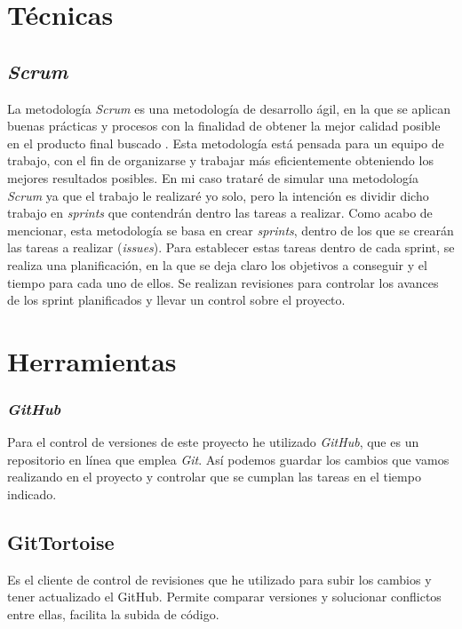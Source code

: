 
\section{Técnicas}

\subsection{\textit{Scrum}}
La metodología \textit{Scrum} es una metodología de desarrollo ágil, en la que se aplican buenas prácticas y procesos con la finalidad de obtener la mejor calidad posible en el producto final buscado \cite{scrum}.\newline
Esta metodología está pensada para un equipo de trabajo, con el fin de organizarse y trabajar más eficientemente obteniendo los mejores resultados posibles. En mi caso trataré de simular una metodología \textit{Scrum} ya que el trabajo le realizaré yo solo, pero la intención es dividir dicho trabajo en \textit{sprints} que contendrán dentro las tareas a realizar.\newline
Como acabo de mencionar, esta metodología se basa en crear \textit{sprints}, dentro de los que se crearán las tareas a realizar (\textit{issues}). Para establecer estas tareas dentro de cada sprint, se realiza una planificación, en la que se deja claro los objetivos a conseguir y el tiempo para cada uno de ellos. 
Se realizan revisiones para controlar los avances de los sprint planificados y llevar un control sobre el proyecto.



\section{Herramientas}
\subsubsection{\textit{GitHub}}
Para el control de versiones de este proyecto he utilizado \textit{GitHub}, que es un repositorio en línea que emplea \textit{Git}. Así podemos guardar los cambios que vamos realizando en el proyecto y controlar que se cumplan las tareas en el tiempo indicado.

\subsection{GitTortoise}
Es el cliente de control de revisiones que he utilizado para subir los cambios y tener actualizado el GitHub. Permite comparar versiones y solucionar conflictos entre ellas, facilita la subida de código.\cite{wiki:gitTortoise}
